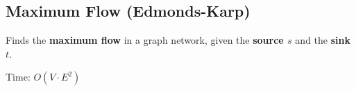 \subsection{Maximum Flow (Edmonds-Karp)}

Finds the \textbf{maximum flow} in a graph network, given the \textbf{source $s$} and the \textbf{sink $t$}.


Time: $O(V \cdot E^2)$
